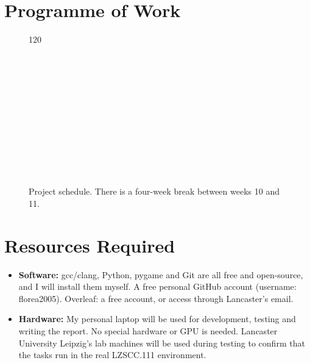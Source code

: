 \documentclass[11pt,a4paper]{article}
\begin{document}
\section{Programme of Work}\label{sec:programme}

\begin{figure}[H]
	\centering
	\begin{ganttchart}[
			x unit=.55cm,
			y unit title=.5cm,
			title height=1,
			y unit chart=.6cm,
			vgrid={*{9}{gray!25},{gray!80,line width=1pt},*{10}{gray!25}},
			hgrid=false,
			title label font=\footnotesize,
			bar label font=\small,
			milestone label font=\small\itshape,
			bar/.append style={fill=blue!30},
			milestone/.append style={fill=red!70},
		]{1}{20}
		 \\
		 \\
		 \\
		 \\
		 \\
		 \\
		 \\
		 \\
		 \\
		 \\
		 \\
		 \\
	\end{ganttchart}
	\caption{Project schedule. There is a four-week break between weeks 10 and 11.}
	\label{fig:gantt}
\end{figure}

\section{Resources Required}\label{sec:resources}
\begin{itemize}
	\item \textbf{Software:} gcc/clang, Python, pygame and Git are all free and open-source, and I will install them myself. A free personal GitHub account (username: florea2005). Overleaf: a free account, or access through Lancaster’s email.
	\item \textbf{Hardware:} My personal laptop will be used for development, testing and writing the report. No special hardware or GPU is needed. Lancaster University Leipzig’s lab machines will be used during testing to confirm that the tasks run in the real LZSCC.111 environment.
\end{itemize}
\end{document}
